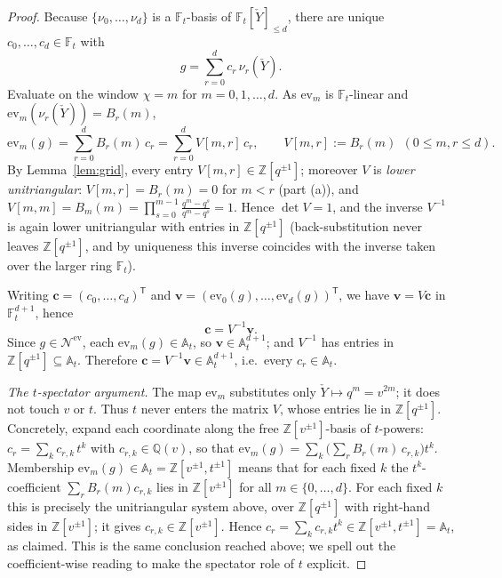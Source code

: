 \documentclass[11pt]{article}
\newcommand{\At}{\mathbb{A}_t}
\newcommand{\Ft}{\mathbb{F}_t}
\newcommand{\Nev}{\mathcal N^{\mathrm{ev}}}
\newcommand{\Yc}{\check Y}
\newcommand{\Z}{\mathbb Z}
\newcommand{\ev}{\mathrm{ev}}
\begin{document}
\begin{proof}
Because $\{\nu_0,\dots,\nu_d\}$ is a $\Ft$-basis of $\Ft[\Yc]_{\le d}$, there are
unique $c_0,\dots,c_d\in\Ft$ with
\[
  g=\sum_{r=0}^{d}c_r\,\nu_r(\Yc).
\]
Evaluate on the window $\chi=m$ for $m=0,1,\dots,d$. As $\ev_m$ is
$\Ft$-linear and $\ev_m(\nu_r(\Yc))=B_r(m)$,
\[
  \ev_m(g)=\sum_{r=0}^{d}B_r(m)\,c_r
  =\sum_{r=0}^{d}V[m,r]\,c_r,
  \qquad V[m,r]:=B_r(m)\ \ (0\le m,r\le d).
\]
By Lemma~\ref{lem:grid}, every entry $V[m,r]\in\Z[q^{\pm1}]$; moreover $V$ is
\emph{lower unitriangular}: $V[m,r]=B_r(m)=0$ for $m<r$ (part (a)), and
$V[m,m]=B_m(m)=\prod_{s=0}^{m-1}\frac{q^{m}-q^{s}}{q^{m}-q^{s}}=1$. Hence
$\det V=1$, and the inverse $V^{-1}$ is again lower unitriangular with entries in
$\Z[q^{\pm1}]$ (back-substitution never leaves $\Z[q^{\pm1}]$, and by uniqueness
this inverse coincides with the inverse taken over the larger ring $\Ft$).

Writing $\mathbf c=(c_0,\dots,c_d)^{\mathsf T}$ and
$\mathbf v=(\ev_0(g),\dots,\ev_d(g))^{\mathsf T}$, we have $\mathbf v=V\mathbf c$
in $\Ft^{d+1}$, hence
\[
  \mathbf c=V^{-1}\mathbf v .
\]
Since $g\in\Nev$, each $\ev_m(g)\in\At$, so $\mathbf v\in\At^{d+1}$; and
$V^{-1}$ has entries in $\Z[q^{\pm1}]\subseteq\At$. Therefore
$\mathbf c=V^{-1}\mathbf v\in\At^{d+1}$, i.e.\ every $c_r\in\At$.

\smallskip
\emph{The $t$-spectator argument.}\;
The map $\ev_m$ substitutes only $\Yc\mapsto q^{m}=v^{2m}$; it does not touch $v$
or $t$. Thus $t$ never enters the matrix $V$, whose entries lie in
$\Z[q^{\pm1}]$. Concretely, expand each coordinate along the free
$\Z[v^{\pm1}]$-basis of $t$-powers: $c_r=\sum_{k}c_{r,k}\,t^{k}$ with
$c_{r,k}\in\mathbb Q(v)$, so that
$\ev_m(g)=\sum_{k}\bigl(\sum_{r}B_r(m)\,c_{r,k}\bigr)t^{k}$. Membership
$\ev_m(g)\in\At=\Z[v^{\pm1},t^{\pm1}]$ means that for each fixed $k$ the
$t^{k}$-coefficient $\sum_r B_r(m)c_{r,k}$ lies in $\Z[v^{\pm1}]$ for all
$m\in\{0,\dots,d\}$. For each fixed $k$ this is precisely the unitriangular
system above, over $\Z[q^{\pm1}]$ with right-hand sides in $\Z[v^{\pm1}]$; it
gives $c_{r,k}\in\Z[v^{\pm1}]$. Hence
$c_r=\sum_k c_{r,k}t^{k}\in\Z[v^{\pm1},t^{\pm1}]=\At$, as claimed. This is the
same conclusion reached above; we spell out the coefficient-wise reading to make
the spectator role of $t$ explicit.


\end{proof}
\end{document}
